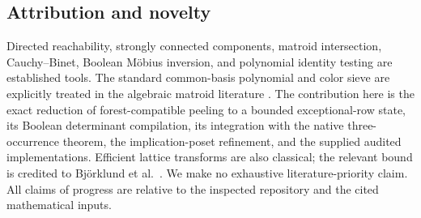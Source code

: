 \subsection{Attribution and novelty}

Directed reachability, strongly connected components, matroid intersection,
Cauchy--Binet, Boolean M\"obius inversion, and polynomial identity testing
are established tools.  The standard common-basis polynomial and color
sieve are explicitly treated in the algebraic matroid literature
\cite{Harvey2009,EibenKoanaWahlstrom2025}.  The contribution here is the
exact reduction of forest-compatible peeling to a bounded exceptional-row
state, its Boolean determinant compilation, its integration with the
native three-occurrence theorem, the implication-poset refinement, and
the supplied audited implementations.  Efficient lattice transforms are
also classical; the relevant bound is credited to
Bj\"orklund et al.\ \cite{FastZeta2012}.
We make no exhaustive literature-priority claim.  All claims of progress
are relative to the inspected repository and the cited mathematical inputs.
